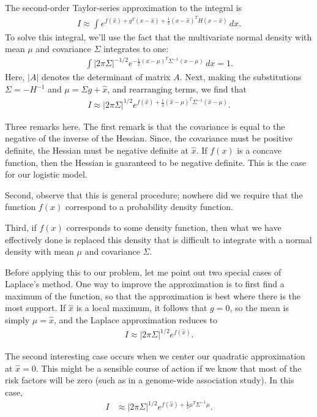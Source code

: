 \documentclass[final]{siamltex}
\newcommand{\half}{{\textstyle\frac{1}{2}}}
\newcommand{\smint}{\textstyle\int}
\begin{document}
The second-order Taylor-series approximation to the integral is
\begin{align*}
I \approx \smint 
e^{f(\hat{x}) + g^T(x - \hat{x}) + \half(x - \hat{x})^TH(x-\hat{x})} \, dx.
\end{align*}
To solve this integral, we'll use the fact that the multivariate
normal density with mean $\mu$ and covariance $\Sigma$ integrates to
one:
\begin{align*}
\smint |2\pi\Sigma|^{-1/2} e^{-\frac{1}{2}(x-\mu)^T\Sigma^{-1}(x-\mu)} 
\, dx = 1.
\end{align*}
Here, $|A|$ denotes the determinant of matrix $A$. Next, making the
substitutions $\Sigma = -H^{-1}$ and $\mu = \Sigma g + \hat{x}$, and
rearranging terms, we find that
\begin{align*}
I \approx |2\pi\Sigma|^{1/2} 
e^{f(\hat{x}) + \frac{1}{2}(\hat{x}-\mu)^T\Sigma^{-1}(\hat{x}-\mu)}.
\end{align*}

Three remarks here. The first remark is that the covariance is equal
to the negative of the inverse of the Hessian. Since, the covariance
must be positive definite, the Hessian must be negative definite at
$\hat{x}$. If $f(x)$ is a concave function, then the Hessian is
guaranteed to be negative definite. This is the case for our logistic
model.

Second, observe that this is general procedure; nowhere did we require
that the function $f(x)$ correspond to a probability density function.

Third, if $f(x)$ corresponds to some density function, then what we
have effectively done is replaced this density that is difficult to
integrate with a normal density with mean $\mu$ and covariance
$\Sigma$.

Before applying this to our problem, let me point out two special
cases of Laplace's method. One way to improve the approximation is to
first find a maximum of the function, so that the approximation is
best where there is the most support. If $\hat{x}$ is a local maximum,
it follows that $g = 0$, so the mean is simply $\mu = \hat{x}$, and
the Laplace approximation reduces to
\begin{align*}
I \approx |2\pi\Sigma|^{1/2} e^{f(\hat{x})}.
\end{align*}

The second interesting case occurs when we center our quadratic
approximation at $\hat{x} = 0$. This might be a sensible course of
action if we know that most of the risk factors will be zero (such as
in a genome-wide association study). In this case,
\begin{align*}
I &\approx |2\pi\Sigma|^{1/2}
e^{f(\hat{x}) + \frac{1}{2}\mu^T\Sigma^{-1}\mu}.
\end{align*}
\end{document}
